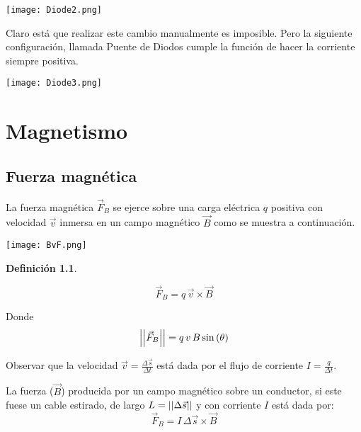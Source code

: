 \documentclass[a5paper,12pt,twoside]{book}
\newtheorem{defn}{{Definición}}[chapter]
\begin{document}
\begin{center}
    \texttt{[image: Diode2.png]}
\end{center}

Claro está que realizar este cambio manualmente es imposible. Pero la siguiente configuración, llamada Puente de Diodos cumple la función de hacer la corriente siempre positiva.

\begin{center}
    \texttt{[image: Diode3.png]}
\end{center}


\chapter{Magnetismo}


\section{Fuerza magnética}

La fuerza magnética $\Vec{F}_B$ se ejerce sobre una carga eléctrica $q$ positiva con velocidad $\Vec{v}$ inmersa en un campo magnético $\Vec{B}$ como se muestra a continuación.

\begin{center}
    \texttt{[image: BvF.png]}
\end{center}

\begin{mdframed}[style=MyFrame1]
    \begin{defn}
    \end{defn}
    \begin{equation*}
        \Vec{F}_B = q \, \Vec{v} \times \Vec{B}
    \end{equation*}
\end{mdframed}

Donde
\begin{equation*}
    {\left|\left| {\Vec{F}_B} \right|\right|} = q \, v \, B \sin\left(\theta\right)
\end{equation*}

Observar que la velocidad $\Vec{v} = \tfrac{\Delta \Vec{s}}{\Delta t}$ está dada por el flujo de corriente $I = \tfrac{q}{\Delta t}$.

La fuerza ($\Vec{B}$) producida por un campo magnético sobre un conductor, si este fuese un cable estirado, de largo $L = {\left|\left| {\Delta \Vec{s}} \right|\right|}$ y con corriente $I$ está dada por:
\begin{equation*}
    \Vec{F}_B = I \, \Delta \Vec{s} \times \Vec{B}
\end{equation*}
\end{document}

